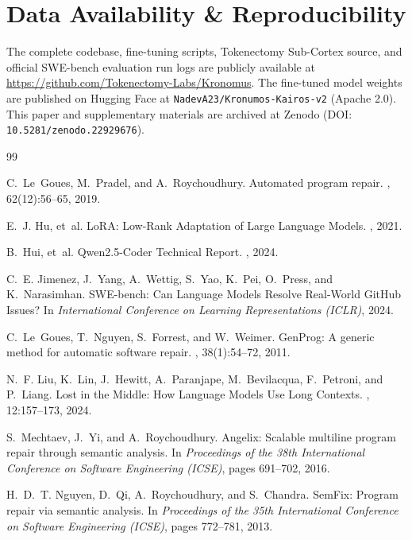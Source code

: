 \documentclass[10pt,twocolumn,letterpaper]{article}
\begin{document}
\section*{Data Availability \& Reproducibility}
The complete codebase, fine-tuning scripts, Tokenectomy Sub-Cortex source, and official SWE-bench evaluation run logs are publicly available at \url{https://github.com/Tokenectomy-Labs/Kronomus}. The fine-tuned model weights are published on Hugging Face at \texttt{NadevA23/Kronumos-Kairos-v2} (Apache 2.0). This paper and supplementary materials are archived at Zenodo (DOI: \texttt{10.5281/zenodo.22929676}).


\begin{thebibliography}{99}

C.~Le~Goues, M.~Pradel, and A.~Roychoudhury.
\newblock Automated program repair.
, 62(12):56--65, 2019.

E.~J. Hu, et~al.
\newblock LoRA: Low-Rank Adaptation of Large Language Models.
, 2021.

B.~Hui, et~al.
\newblock Qwen2.5-Coder Technical Report.
, 2024.

C.~E. Jimenez, J.~Yang, A.~Wettig, S.~Yao, K.~Pei, O.~Press, and K.~Narasimhan.
\newblock SWE-bench: Can Language Models Resolve Real-World GitHub Issues?
\newblock In {\em International Conference on Learning Representations (ICLR)}, 2024.

C.~Le~Goues, T.~Nguyen, S.~Forrest, and W.~Weimer.
\newblock GenProg: A generic method for automatic software repair.
, 38(1):54--72, 2011.

N.~F. Liu, K.~Lin, J.~Hewitt, A.~Paranjape, M.~Bevilacqua, F.~Petroni, and P.~Liang.
\newblock Lost in the Middle: How Language Models Use Long Contexts.
, 12:157--173, 2024.

S.~Mechtaev, J.~Yi, and A.~Roychoudhury.
\newblock Angelix: Scalable multiline program repair through semantic analysis.
\newblock In {\em Proceedings of the 38th International Conference on Software Engineering (ICSE)}, pages 691--702, 2016.

H.~D.~T. Nguyen, D.~Qi, A.~Roychoudhury, and S.~Chandra.
\newblock SemFix: Program repair via semantic analysis.
\newblock In {\em Proceedings of the 35th International Conference on Software Engineering (ICSE)}, pages 772--781, 2013.


\end{thebibliography}
\end{document}
